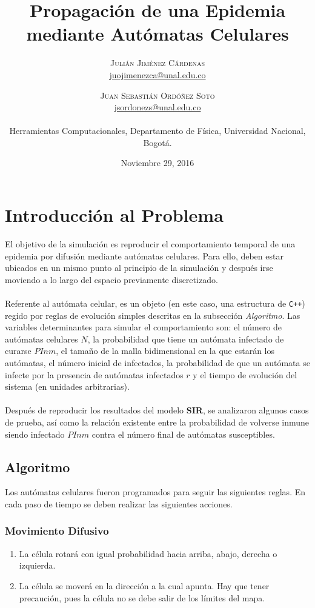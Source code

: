 \documentclass[twoside,twocolumn]{article}
\title{Propagación de una Epidemia mediante Autómatas Celulares} %
\author{%
\textsc{Julián Jiménez Cárdenas} \\[1ex] %
\normalsize \href{mailto:juojimenezca@unal.edu.co}{juojimenezca@unal.edu.co} %
\and %
\textsc{Juan Sebastián Ordóñez Soto} \\[1ex]
\normalsize \href{mailto:jsordonezs@unal.edu.co}{jsordonezs@unal.edu.co} 
\\ \\ \normalsize{Herramientas Computacionales, Departamento de Física, Universidad Nacional, Bogotá.} %
}
\date{\normalsize{Noviembre 29, 2016}} %
\newcommand{\code}[1]{\colorbox{light-gray}{\texttt{#1}}}
\begin{document}
\maketitle
\section{Introducción al Problema}
El objetivo de la simulación es reproducir el comportamiento temporal de una epidemia por difusión mediante autómatas celulares. Para ello, deben estar ubicados en un mismo punto al principio de la simulación y después irse moviendo a lo largo del espacio previamente discretizado.\\ \\
Referente al autómata celular, es un objeto (en este caso, una estructura de \code{C++}) regido por reglas de evolución simples descritas en la subsección \textit{Algoritmo}. Las variables determinantes para simular el comportamiento son: el número de autómatas celulares $N$, la probabilidad que tiene un autómata infectado de curarse $PInm$, el tamaño de la malla bidimensional en la que estarán los autómatas, el número inicial de infectados, la probabilidad de que un autómata se infecte por la presencia de autómatas infectados $r$ y el tiempo de evolución del sistema (en unidades arbitrarias).\\ \\
Después de reproducir los resultados del modelo \textbf{SIR}, se analizaron algunos casos de prueba, así como la relación existente entre la probabilidad de volverse inmune siendo infectado $PInm$ contra el número final de autómatas susceptibles.
\subsection{Algoritmo}
Los autómatas celulares fueron programados para seguir las siguientes reglas. En cada paso de tiempo se deben realizar las siguientes acciones.
\subsubsection{Movimiento Difusivo}
\begin{enumerate}
\item La célula rotará con igual probabilidad hacia arriba, abajo, derecha o izquierda.
\item La célula se moverá en la dirección a la cual apunta. Hay que tener precaución, pues la célula no se debe salir de los límites del mapa.
\end{enumerate}
\end{document}
